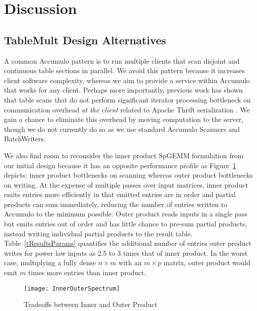 
\section{Discussion}
\label{sDiscussion}

\subsection{TableMult Design Alternatives}

A common Accumulo pattern is to run multiple clients that scan disjoint and continuous table sections in parallel.
We avoid this pattern because it increases client software complexity,
whereas we aim to provide a service within Accumulo that works for any client.
Perhaps more importantly, previous work has shown that table scans 
that do not perform significant iterator processing %
bottleneck on communication overhead \emph{at the client} related to Apache Thrift serialization \cite{sawyer2013understanding}.
We gain a chance to eliminate this overhead by moving computation to the server,
though we do not currently do so as we use standard Accumulo Scanners and BatchWriters.

We also find room to reconsider the inner product SpGEMM formulation from our initial design
because it has an opposite performance profile as Figure~\ref{fInnerOuterSpectrum} depicts: 
inner product bottlenecks on scanning whereas outer product bottlenecks on writing.
At the expense of multiple passes over input matrices, inner product emits entries more efficiently
in that emitted entries are in order and partial products can sum immediately, 
reducing the number of entries written to Accumulo to the minimum possible.
Outer product reads inputs in a single pass
but emits %
entries out of order and 
has little chance to pre-sum partial products, 
instead writing individual partial products to the result table.
Table~\ref{tResultsParams} quantifies the additional number of entries outer product writes
for power law inputs as 2.5 to 3 times that of inner product.
In the worst case, multiplying a fully dense $n \times m$ with an $m \times p$ matrix,
outer product would emit $m$ times more entries than inner product.

\begin{figure}[tbh]
\centering
\texttt{[image: InnerOuterSpectrum]}
\caption{Tradeoffs between Inner and Outer Product}
\label{fInnerOuterSpectrum}
\end{figure}

